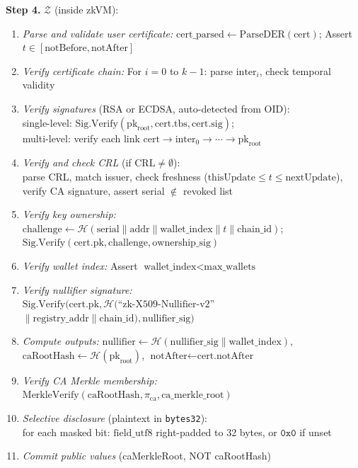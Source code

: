 \documentclass[11pt, a4paper]{article}
\begin{document}
\begin{mdframed}[linewidth=0.5pt, innertopmargin=8pt, innerbottommargin=8pt]
\medskip
\textbf{Step 4.} $\mathcal{Z}$ (inside zkVM):
\begin{enumerate}[nosep,leftmargin=1.5em]
\item \textit{Parse and validate user certificate:}
  $\text{cert\_parsed} \leftarrow \text{ParseDER}(\text{cert})$;
  Assert $t \in [\text{notBefore}, \text{notAfter}]$
\item \textit{Verify certificate chain:}
  For $i = 0$ to $k{-}1$: parse $\text{inter}_i$, check temporal validity
\item \textit{Verify signatures} (RSA or ECDSA, auto-detected from OID):\\
  single-level: $\text{Sig.Verify}(\text{pk}_{\text{root}}, \text{cert.tbs}, \text{cert.sig})$;\\
  multi-level: verify each link $\text{cert} \rightarrow \text{inter}_0 \rightarrow \cdots \rightarrow \text{pk}_{\text{root}}$
\item \textit{Verify and check CRL} (if $\text{CRL} \neq \emptyset$):\\
  parse CRL, match issuer, check freshness ($\text{thisUpdate} \leq t \leq \text{nextUpdate}$),\\
  verify CA signature, assert serial $\notin$ revoked list
\item \textit{Verify key ownership:}\\
  $\text{challenge} \leftarrow \mathcal{H}(\text{serial} \| \text{addr} \| \text{wallet\_index} \| t \| \text{chain\_id})$;\\
  $\text{Sig.Verify}(\text{cert.pk}, \text{challenge}, \text{ownership\_sig})$
\item \textit{Verify wallet index:} Assert $\text{wallet\_index} < \text{max\_wallets}$
\item \textit{Verify nullifier signature:}\\
  $\text{Sig.Verify}(\text{cert.pk}, \mathcal{H}(\text{``zk-X509-Nullifier-v2''}$\\
  $\| \text{registry\_addr} \| \text{chain\_id}), \text{nullifier\_sig})$
\item \textit{Compute outputs:}
  $\text{nullifier} \leftarrow \mathcal{H}(\text{nullifier\_sig} \| \text{wallet\_index})$,
  $\text{caRootHash} \leftarrow \mathcal{H}(\text{pk}_{\text{root}})$,
  $\text{notAfter} \leftarrow \text{cert.notAfter}$
\item \textit{Verify CA Merkle membership:}
  $\text{MerkleVerify}(\text{caRootHash}, \pi_{\text{ca}}, \text{ca\_merkle\_root})$
\item \textit{Selective disclosure} (plaintext in \texttt{bytes32}):\\
  for each masked bit: $\text{field\_utf8}$ right-padded to 32 bytes, or $\texttt{0x0}$ if unset
\item \textit{Commit public values} (caMerkleRoot, NOT caRootHash)
\end{enumerate}


\end{mdframed}
\end{document}
